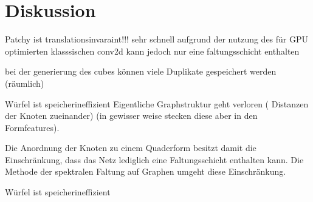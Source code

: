 \section{Diskussion}
\label{diskussion}

Patchy ist translationsinvaraint!!! sehr schnell aufgrund der nutzung des für GPU optimierten klasssischen conv2d
kann jedoch nur eine faltungsschicht enthalten

bei der generierung des cubes können viele Duplikate gespeichert werden (räumlich)

Würfel ist speicherineffizient
Eigentliche Graphstruktur geht verloren (\zB{} Distanzen der Knoten zueinander) (in gewisser weise stecken diese aber in den Formfeatures).

Die Anordnung der Knoten zu einem Quaderform besitzt damit die Einschränkung, dass das Netz lediglich eine Faltungsschicht enthalten kann.
Die Methode der spektralen Faltung auf Graphen umgeht diese Einschränkung.

Würfel ist speicherineffizient
